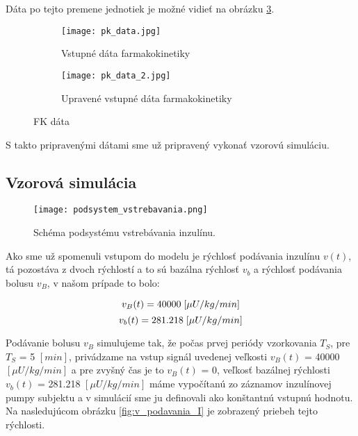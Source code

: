 \documentclass[11pt]{article} %
\begin{document}
Dáta po tejto premene jednotiek je možné vidieť na obrázku \ref{fig:pk_data_2}.

\begin{figure} %
\begin{subfigure}{.5\textwidth}
	\centering
	
	\texttt{[image: pk\_data.jpg]} %
	\caption{Vstupné dáta farmakokinetiky}
	\label{fig:pk_data}
\end{subfigure}
\begin{subfigure}{.5\textwidth}
	\centering
	\texttt{[image: pk\_data\_2.jpg]} %
	\caption{Upravené vstupné dáta farmakokinetiky}
	\label{fig:pk_data_2}
\end{subfigure}
\caption{FK dáta}
\end{figure} 
S takto pripravenými dátami sme už pripravený vykonať vzorovú simuláciu.

\newpage

\subsection{Vzorová simulácia}

\begin{figure}[h]
	\centering
	\texttt{[image: podsystem\_vstrebavania.png]} 
	\caption{Schéma podsystému vstrebávania inzulínu.}
	\label{fig:schema}
\end{figure}

Ako sme už spomenuli vstupom do modelu je rýchlosť podávania inzulínu $v(t)$, tá pozostáva z dvoch rýchlostí a to sú bazálna rýchlosť ${v_b}$ a rýchlosť podávania bolusu $v_B$, v našom prípade to bolo: 

\begin{equation}
v_B(t) = 40000 \hspace{1mm} [\mu U/kg/min] 
\end{equation}
\begin{equation}
v_b(t) = 281.218 \hspace{1mm} [\mu U/kg/min]
\end{equation}

Podávanie bolusu $v_B$ simulujeme tak, že počas prvej periódy vzorkovania $T_S$, pre $T_S$ = 5 $[min]$, privádzame na vstup signál uvedenej veľkosti $v_B(t)$ = 40000 $[\mu U/kg/min]$ a pre zvyšný čas je to $v_B(t)$ = 0, veľkosť bazálnej rýchlosti $v_b(t)$ = 281.218 $[\mu U/kg/min]$ máme vypočítanú zo záznamov inzulínovej pumpy subjektu a v simulácií sme ju definovali ako konštantnú vstupnú hodnotu. Na nasledujúcom obrázku \ref{fig:v_podavania_I} je zobrazený priebeh tejto rýchlosti.
\end{document}
